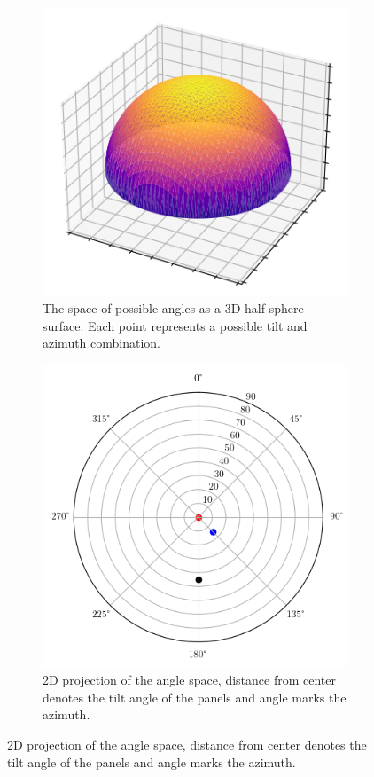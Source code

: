 \begin{figure}[h]
	
     \centering
     \begin{subfigure}[b]{0.35\textwidth}
         \centering
         \includegraphics[width=\textwidth]{pics/halfdome}
         \caption{The space of possible angles as a 3D half sphere surface. Each point represents a possible tilt and azimuth combination.}
         \label{fig_halfdome}
     \end{subfigure}
     \hfill
     \begin{subfigure}[b]{0.35\textwidth}
         \centering
         \includegraphics[width=\textwidth]{pics/polarplot}
         \caption{2D projection of the angle space, distance from center denotes the tilt angle of the panels and angle marks the azimuth.}
         

\end{subfigure}
\end{figure}
